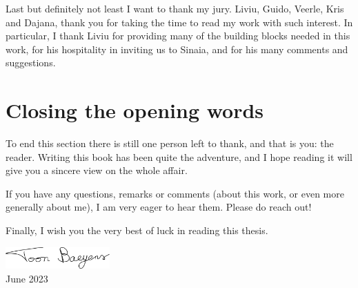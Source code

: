 Last but definitely not least I want to thank my jury. Liviu, Guido, Veerle, Kris and Dajana, thank you for taking the time to read my work with such interest. In particular, I thank Liviu for providing many of the building blocks needed in this work, for his hospitality in inviting us to Sinaia, and for his many comments and suggestions.

\section*{Closing the opening words}

To end this section there is still one person left to thank, and that is you: the reader. Writing this book has been quite the adventure, and I hope reading it will give you a sincere view on the whole affair.

If you have any questions, remarks or comments (about this work, or even more generally about me), I am very eager to hear them. Please do reach out!

Finally, I wish you the very best of luck in reading this thesis.


\begin{flushright}
    \includegraphics[width=4cm]{img/signature.pdf}\\
    June 2023
\end{flushright}

\stopchapter
